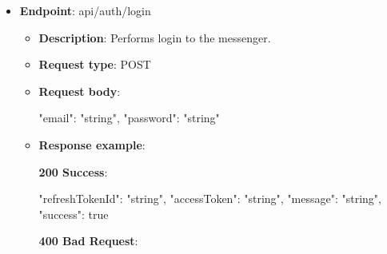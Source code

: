\begin{itemize}
\begin{itemize}
        \textbf{400 Bad Request}:

        \begin{spverbatim}
        {
            "errorMessage": "string",
            "errorDetails": "string",
            "statusCode": 0,
            "success": false
        }
        \end{spverbatim}

        \textbf{409 Conflict}:

        \begin{spverbatim}
        {
            "errorMessage": "string",
            "errorDetails": "string",
            "statusCode": 0,
            "success": false
        }
        \end{spverbatim}
        \item \textbf{Response messages}:
        \begin{enumerate}
            \item Success.
            \item Invalid or expired.
            \item Phone already verified
        \end{enumerate}
    \end{itemize}

    \item \textbf{Endpoint}: api/auth/login

    \begin{itemize}
        \item \textbf{Description}: Performs login to the messenger.
        \item \textbf{Request type}: POST
        \item \textbf{Request body}:
        \begin{spverbatim}
        {
            "email": "string",
            "password": "string"
        }
        \end{spverbatim}
        \item  \textbf{Response example}:

        \textbf{200 Success}:

        \begin{spverbatim}
        {
            "refreshTokenId": "string",
            "accessToken": "string",
            "message": "string",
            "success": true
        }
        \end{spverbatim}

        \textbf{400 Bad Request}:


\end{itemize}
\end{itemize}
